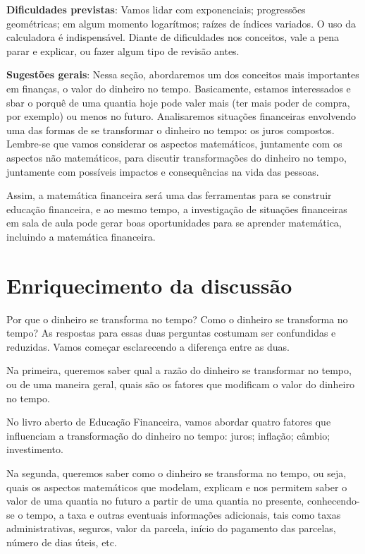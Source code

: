 \begin{paginatexto2}
\textbf{Dificuldades previstas}: Vamos lidar com exponenciais; progressões geométricas; em algum momento logarítmos; raízes de índices variados. O uso da calculadora é indispensável. Diante de dificuldades nos conceitos, vale a pena parar e explicar, ou fazer algum tipo de revisão antes.

\textbf{Sugestões gerais}: Nessa seção, abordaremos um dos conceitos mais importantes em finanças, o valor do dinheiro no tempo. Basicamente, estamos interessados e sbar o porquê de uma quantia hoje pode valer mais (ter mais poder de compra, por exemplo) ou menos no futuro. Analisaremos situações financeiras envolvendo uma das formas de se transformar o dinheiro no tempo: os juros compostos. Lembre-se que vamos considerar os aspectos matemáticos, juntamente com os aspectos não matemáticos, para discutir transformações do dinheiro no tempo, juntamente com possíveis impactos e consequências na vida das pessoas.

Assim, a matemática financeira será uma das ferramentas para se construir educação financeira, e ao mesmo tempo, a investigação de situações financeiras em sala de aula pode gerar boas oportunidades para se aprender matemática, incluindo a matemática financeira.

\section*{Enriquecimento da discussão}

Por que o dinheiro se transforma no tempo? Como o dinheiro se transforma no tempo? As respostas para essas duas perguntas costumam ser confundidas e reduzidas. Vamos começar esclarecendo a diferença entre as duas.

Na primeira, queremos saber qual a razão do dinheiro se transformar no tempo, ou de uma maneira geral, quais são os fatores que modificam o valor do dinheiro no tempo.

No livro aberto de Educação Financeira, vamos abordar quatro fatores que influenciam a transformação do dinheiro no tempo: juros; inflação; câmbio; investimento.

Na segunda, queremos saber como o dinheiro se transforma no tempo, ou seja, quais os aspectos matemáticos que modelam, explicam e nos permitem saber o valor de uma quantia no futuro a partir de uma quantia no presente, conhecendo-se o tempo, a taxa e outras eventuais informações adicionais, tais como taxas administrativas, seguros, valor da parcela, início do pagamento das parcelas, número de dias úteis, etc.


\end{paginatexto2}
